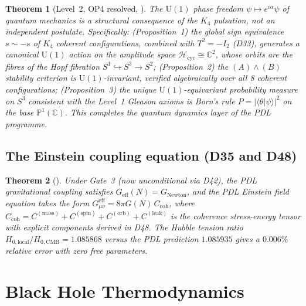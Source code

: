 \documentclass[11pt,a4paper]{article}
\theoremstyle{plain}
\newtheorem{theorem}{Theorem}[section]
\theoremstyle{definition}
\theoremstyle{remark}
\newcommand{\Ccoh}{C_{\mathrm{coh}}}
\begin{document}
\begin{theorem}[Level~2, OP4 resolved, \cite{D46}]
\label{thm:BornL2}
The $\mathrm{U}(1)$ phase freedom $\psi \mapsto e^{i\alpha}\psi$ of quantum mechanics is a structural consequence of the $K_4$ pulsation, not an independent postulate. Specifically: (Proposition~1) the global sign equivalence $s \sim -s$ of $K_4$ coherent configurations, combined with $T^2=-I_2$ (D33), generates a canonical $\mathrm{U}(1)$ action on the amplitude space $\mathcal{H}_{\mathrm{cyc}} \cong \mathbb{C}^2$, whose orbits are the fibres of the Hopf fibration $S^1\hookrightarrow S^3\to S^2$; (Proposition~2) the $(A)\wedge(B)$ stability criterion is $\mathrm{U}(1)$-invariant, verified algebraically over all 8 coherent configurations; (Proposition~3) the unique $\mathrm{U}(1)$-equivariant probability measure on $S^3$ consistent with the Level~1 Gleason axioms is Born's rule $P=|\langle\theta|\psi\rangle|^2$ on the base $\mathbb{P}^1(\mathbb{C})$. This completes the quantum dynamics layer of the PDL programme.
\end{theorem}

\subsection{The Einstein coupling equation (D35 and D48)}
\label{subsec:einstein}
\begin{theorem}[\cite{D35,D48}]
\label{thm:Einstein}
Under Gate~3 (now unconditional via D42), the PDL gravitational coupling satisfies $G_{\mathrm{eff}}(N)=G_{\mathrm{Newton}}$, and the PDL Einstein field equation takes the form $G_{\mu\nu}^{\mathrm{eff}}=8\pi G(N)\,\Ccoh$, where $\Ccoh = C^{(\mathrm{mass})} + C^{(\mathrm{spin})} + C^{(\mathrm{orb})} + C^{(\mathrm{leak})}$ is the coherence stress-energy tensor with explicit components derived in D48. The Hubble tension ratio $H_{0,\mathrm{local}}/H_{0,\mathrm{CMB}}=1.085868$ versus the PDL prediction $1.085935$ gives a $0.006\%$ relative error with zero free parameters.
\end{theorem}

\section{Black Hole Thermodynamics}
\label{sec:bh}
\end{document}
